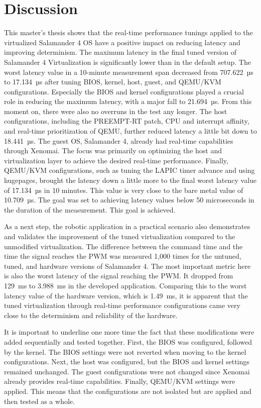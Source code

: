 \documentclass[MMR,Master,english]{style/twbook}
\begin{document}
\clearpage

\chapter{Discussion}\label{cha:discussion}
This master's thesis shows that the real-time performance tunings applied to the virtualized Salamander 4 OS have a positive impact on reducing latency and improving determinism. The maximum latency in the final tuned version of Salamander 4 Virtualization is significantly lower than in the default setup. The worst latency value in a 10-minute measurement span decreased from 707.622~µs to 17.134~µs after tuning BIOS, kernel, host, guest, and QEMU/KVM configurations. Especially the BIOS and kernel configurations played a crucial role in reducing the maximum latency, with a major fall to 21.694~µs. From this moment on, there were also no overruns in the test any longer. The host configurations, including the PREEMPT-RT patch, CPU and interrupt affinity, and real-time prioritization of QEMU, further reduced latency a little bit down to 18.441~µs. The guest OS, Salamander 4, already had real-time capabilities through Xenomai. The focus was primarily on optimizing the host and virtualization layer to achieve the desired real-time performance. Finally, QEMU/KVM configurations, such as tuning the LAPIC timer advance and using hugepages, brought the latency down a little more to the final worst latency value of 17.134~µs in 10 minutes. This value is very close to the bare metal value of 10.709~µs. The goal was set to achieving latency values below 50 microseconds in the duration of the measurement. This goal is achieved.

\bigskip \noindent As a next step, the robotic application in a practical scenario also demonstrates and validates the improvement of the tuned virtualization compared to the unmodified virtualization. The difference between the command time and the time the signal reaches the PWM was measured 1,000 times for the untuned, tuned, and hardware versions of Salamander 4. The most important metric here is also the worst latency of the signal reaching the PWM. It dropped from 129~ms to 3.988~ms in the developed application. Comparing this to the worst latency value of the hardware version, which is 1.49~ms, it is apparent that the tuned virtualization through real-time performance configurations came very close to the determinism and reliability of the hardware.

\bigskip \noindent It is important to underline one more time the fact that these modifications were added sequentially and tested together. First, the BIOS was configured, followed by the kernel. The BIOS settings were not reverted when moving to the kernel configurations. Next, the host was configured, but the BIOS and kernel settings remained unchanged. The guest configurations were not changed since Xenomai already provides real-time capabilities. Finally, QEMU/KVM settings were applied. This means that the configurations are not isolated but are applied and then tested as a whole.
\end{document}
